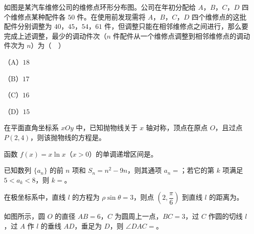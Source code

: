 \begin{question}
如图是某汽车维修公司的维修点环形分布图。公司在年初分配给 $A$，$B$，$C$，$D$ 四个维修点某种配件各 $50$ 件。在使用前发现需将 $A$，$B$，$C$，$D$ 四个维修点的这批配件分别调整为 $40$，$45$，$54$，$61$ 件，但调整只能在相邻维修点之间进行，那么要完成上述调整，最少的调动件次（$n$ 件配件从一个维修点调整到相邻维修点的调动件次为 $n$）为（　）
\nopagebreak[4]
\begin{center}\end{center}
\nopagebreak[4]
（A）$18$

（B）$17$

（C）$16$

（D）$15$

\end{question}

\begin{question}
在平面直角坐标系 $xOy$ 中，已知抛物线关于 $x$ 轴对称，顶点在原点 $O$，且过点 $P(2,4)$，则该抛物线的方程是\gkblank{}。

\end{question}
\begin{question}
函数 $f(x)=x\ln x$（$x>0$）的单调递增区间是\gkblank{}。

\end{question}
\begin{question}
已知数列 $\{a_n\}$ 的前 $n$ 项和 $S_n=n^2-9n$，则其通项 $a_n=$\gkblank{}；若它的第 $k$ 项满足 $5<a_k<8$，则 $k=$\gkblank{}。

\end{question}
\begin{question}
在极坐标系中，直线 $l$ 的方程为 $\rho\sin\theta=3$，则点 $\left(2,\dfrac{\pi}{6}\right)$ 到直线 $l$ 的距离为\gkblank{}。

\Needspace{0.4\textheight}
\end{question}
\begin{question}
如图所示，圆 $O$ 的直径 $AB=6$，$C$ 为圆周上一点，$BC=3$，过 $C$ 作圆的切线 $l$，过 $A$ 作 $l$ 的垂线 $AD$，垂足为 $D$，则 $\angle DAC=$\gkblank{}。
\nopagebreak[4]
\begin{center}\end{center}
\nopagebreak[4]
\end{question}

